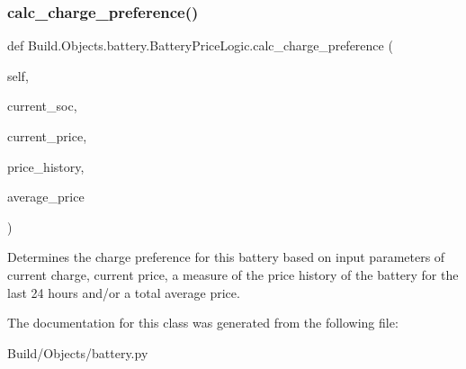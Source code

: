 \subsubsection{\texorpdfstring{calc\+\_\+charge\+\_\+preference()}{calc\_charge\_preference()}}
{\footnotesize\ttfamily def Build.\+Objects.\+battery.\+Battery\+Price\+Logic.\+calc\+\_\+charge\+\_\+preference (\begin{DoxyParamCaption}\item[{}]{self,  }\item[{}]{current\+\_\+soc,  }\item[{}]{current\+\_\+price,  }\item[{}]{price\+\_\+history,  }\item[{}]{average\+\_\+price }\end{DoxyParamCaption})}



Determines the charge preference for this battery based on input parameters of current charge, current price, a measure of the price history of the battery for the last 24 hours and/or a total average price. 



The documentation for this class was generated from the following file\+:\begin{DoxyCompactItemize}
\item 
Build/\+Objects/battery.\+py\end{DoxyCompactItemize}
